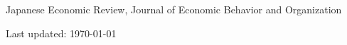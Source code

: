 \documentclass[11pt, a4paper]{article} %
\begin{document}
Japanese Economic Review, Journal of Economic Behavior and Organization


\vfill{} %


\begin{center}
{\scriptsize Last updated: \today} %
\end{center}

\end{document}
